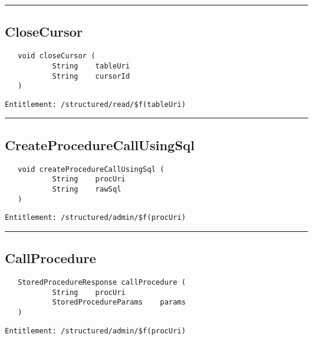 \rule{12cm}{2pt}
\subsection{CloseCursor}
\label{Api:CloseCursor}
\begin{Verbatim}
   void closeCursor (
           String    tableUri
           String    cursorId
   )
\end{Verbatim}
\begin{Verbatim}[formatcom=\color{Maroon}]
  Entitlement: /structured/read/$f(tableUri)
\end{Verbatim}



\rule{12cm}{2pt}
\subsection{CreateProcedureCallUsingSql}
\label{Api:CreateProcedureCallUsingSql}
\begin{Verbatim}
   void createProcedureCallUsingSql (
           String    procUri
           String    rawSql
   )
\end{Verbatim}
\begin{Verbatim}[formatcom=\color{Maroon}]
  Entitlement: /structured/admin/$f(procUri)
\end{Verbatim}



\rule{12cm}{2pt}
\subsection{CallProcedure}
\label{Api:CallProcedure}
\begin{Verbatim}
   StoredProcedureResponse callProcedure (
           String    procUri
           StoredProcedureParams    params
   )
\end{Verbatim}
\begin{Verbatim}[formatcom=\color{Maroon}]
  Entitlement: /structured/admin/$f(procUri)
\end{Verbatim}



